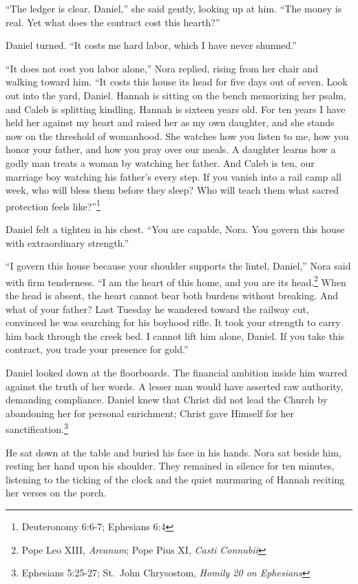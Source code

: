 \documentclass[11pt]{article}
\begin{document}
``The ledger is clear, Daniel,'' she said gently, looking up at him. ``The money is real. Yet what does the contract cost this hearth?''

Daniel turned. ``It costs me hard labor, which I have never shunned.''

``It does not cost you labor alone,'' Nora replied, rising from her chair and walking toward him. ``It costs this house its head for five days out of seven. Look out into the yard, Daniel. Hannah is sitting on the bench memorizing her psalm, and Caleb is splitting kindling. Hannah is sixteen years old. For ten years I have held her against my heart and raised her as my own daughter, and she stands now on the threshold of womanhood. She watches how you listen to me, how you honor your father, and how you pray over our meals. A daughter learns how a godly man treats a woman by watching her father. And Caleb is ten, our marriage boy watching his father's every step. If you vanish into a rail camp all week, who will bless them before they sleep? Who will teach them what sacred protection feels like?''\footnote{Deuteronomy 6:6-7; Ephesians 6:4}

Daniel felt a tighten in his chest. ``You are capable, Nora. You govern this house with extraordinary strength.''

``I govern this house because your shoulder supports the lintel, Daniel,'' Nora said with firm tenderness. ``I am the heart of this home, and you are its head.\footnote{Pope Leo XIII, \textit{Arcanum}; Pope Pius XI, \textit{Casti Connubii}} When the head is absent, the heart cannot bear both burdens without breaking. And what of your father? Last Tuesday he wandered toward the railway cut, convinced he was searching for his boyhood rifle. It took your strength to carry him back through the creek bed. I cannot lift him alone, Daniel. If you take this contract, you trade your presence for gold.''

Daniel looked down at the floorboards. The financial ambition inside him warred against the truth of her words. A lesser man would have asserted raw authority, demanding compliance. Daniel knew that Christ did not lead the Church by abandoning her for personal enrichment; Christ gave Himself for her sanctification.\footnote{Ephesians 5:25-27; St.~John Chrysostom, \textit{Homily 20 on Ephesians}}

He sat down at the table and buried his face in his hands. Nora sat beside him, resting her hand upon his shoulder. They remained in silence for ten minutes, listening to the ticking of the clock and the quiet murmuring of Hannah reciting her verses on the porch.
\end{document}
